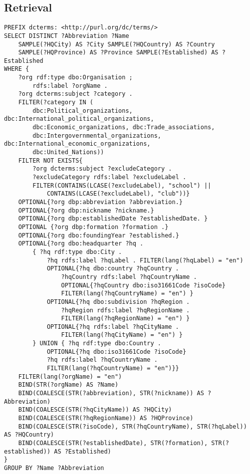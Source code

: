 \documentclass[11pt]{article}
\begin{document}
\subsection{Retrieval}
{\footnotesize\begin{verbatim}
PREFIX dcterms: <http://purl.org/dc/terms/>
SELECT DISTINCT ?Abbreviation ?Name
    SAMPLE(?HQCity) AS ?City SAMPLE(?HQCountry) AS ?Country
    SAMPLE(?HQProvince) AS ?Province SAMPLE(?Established) AS ?Established
WHERE {
    ?org rdf:type dbo:Organisation ;
        rdfs:label ?orgName .
    ?org dcterms:subject ?category .
    FILTER(?category IN (
        dbc:Political_organizations, dbc:International_political_organizations,
        dbc:Economic_organizations, dbc:Trade_associations,
        dbc:Intergovernmental_organizations, dbc:International_economic_organizations,
        dbc:United_Nations))
    FILTER NOT EXISTS{
        ?org dcterms:subject ?excludeCategory .
        ?excludeCategory rdfs:label ?excludeLabel .
        FILTER(CONTAINS(LCASE(?excludeLabel), "school") || 
            CONTAINS(LCASE(?excludeLabel), "club"))}
    OPTIONAL{?org dbp:abbreviation ?abbreviation.}
    OPTIONAL{?org dbp:nickname ?nickname.}
    OPTIONAL{?org dbp:establishedDate ?establishedDate. }
    OPTIONAL {?org dbp:formation ?formation .}
    OPTIONAL{?org dbo:foundingYear ?established.}
    OPTIONAL{?org dbo:headquarter ?hq . 
        { ?hq rdf:type dbo:City .
            ?hq rdfs:label ?hqLabel . FILTER(lang(?hqLabel) = "en")
            OPTIONAL{?hq dbo:country ?hqCountry .
                ?hqCountry rdfs:label ?hqCountryName .
                OPTIONAL{?hqCountry dbo:iso31661Code ?isoCode}
                FILTER(lang(?hqCountryName) = "en") }
            OPTIONAL{?hq dbo:subdivision ?hqRegion .
                ?hqRegion rdfs:label ?hqRegionName .
                FILTER(lang(?hqRegionName) = "en") }
            OPTIONAL{?hq rdfs:label ?hqCityName .
                FILTER(lang(?hqCityName) = "en") }
        } UNION { ?hq rdf:type dbo:Country .
            OPTIONAL{?hq dbo:iso31661Code ?isoCode}
            ?hq rdfs:label ?hqCountryName .
            FILTER(lang(?hqCountryName) = "en")}}
    FILTER(lang(?orgName) = "en")
    BIND(STR(?orgName) AS ?Name)
    BIND(COALESCE(STR(?abbreviation), STR(?nickname)) AS ?Abbreviation)
    BIND(COALESCE(STR(?hqCityName)) AS ?HQCity)
    BIND(COALESCE(STR(?hqRegionName)) AS ?HQProvince)
    BIND(COALESCE(STR(?isoCode), STR(?hqCountryName), STR(?hqLabel)) AS ?HQCountry)
    BIND(COALESCE(STR(?establishedDate), STR(?formation), STR(?established)) AS ?Established)
}
GROUP BY ?Name ?Abbreviation
\end{verbatim}}
\end{document}
